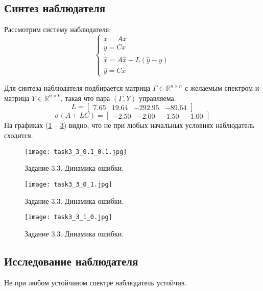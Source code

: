 \subsection{Синтез наблюдателя}
Рассмотрим систему наблюдателя:
\begin{equation}
    \begin{cases}
        \dot{x} = A x \\
        y = C x \\
        \dot{\hat{x}} = A \hat{x} + L(\hat{y} - y) \\
        \hat{y} = C \hat{x}
\end{cases} 
\end{equation}



Для синтеза наблюдателя подбирается матрица \(\Gamma \in \mathbb{R}^{n \times n}\) с желаемым спектром и матрица \(Y \in \mathbb{R}^{n \times k}\), такая что пара \((\Gamma, Y)\) управляема.
\[L = \begin{bmatrix}
    7.65 &  19.64 & -292.95 & -89.64
  \end{bmatrix}\]
  \[\sigma(A + LC) = \begin{bmatrix}
    -2.50 & -2.00 & -1.50 & -1.00
\end{bmatrix}\]
На графиках (\ref{fig:task3_3_0.1_0.1.jpg} -- \ref{fig:task3_3_1_0.jpg}) видно, что не при любых начальных условиях наблюдатель сходится.

\begin{figure}[]
        \centering
        \texttt{[image: task3\_3\_0.1\_0.1.jpg]}
        \caption{Задание 3.3. Динамика ошибки.}
        \label{fig:task3_3_0.1_0.1.jpg}
\end{figure}
\begin{figure}[]
        \centering
        \texttt{[image: task3\_3\_0\_1.jpg]}
        \caption{Задание 3.3. Динамика ошибки.}
        \label{fig:task3_3_0_1.jpg}
\end{figure}

\begin{figure}[]
        \centering
        \texttt{[image: task3\_3\_1\_0.jpg]}
        \caption{Задание 3.3. Динамика ошибки.}
        \label{fig:task3_3_1_0.jpg}
\end{figure}


\subsection{Исследование наблюдателя}
Не при любом устойчивом спектре наблюдатель устойчив. 


